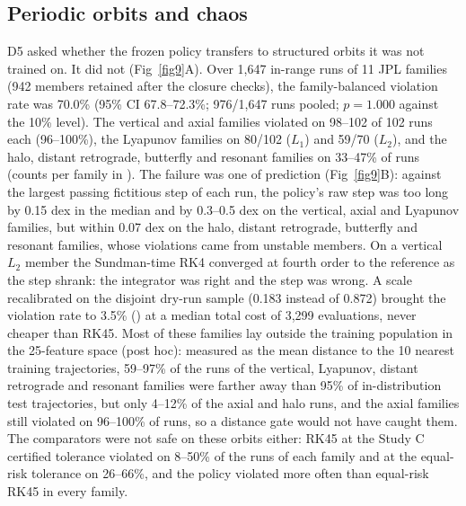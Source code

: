 \documentclass[10pt,letterpaper]{article}
\begin{document}
\subsection*{Periodic orbits and chaos}
D5 asked whether the frozen policy transfers to structured orbits it was not trained on. It did not (Fig~\ref{fig9}A). Over 1,647 in-range runs of 11 JPL families (942 members retained after the closure checks), the family-balanced violation rate was 70.0\% (95\% CI 67.8--72.3\%; 976/1,647 runs pooled; $p = 1.000$ against the 10\% level). The vertical and axial families violated on 98--102 of 102 runs each (96--100\%), the Lyapunov families on 80/102 ($L_1$) and 59/70 ($L_2$), and the halo, distant retrograde, butterfly and resonant families on 33--47\% of runs (counts per family in ). The failure was one of prediction (Fig~\ref{fig9}B): against the largest passing fictitious step of each run, the policy's raw step was too long by 0.15 dex in the median and by 0.3--0.5 dex on the vertical, axial and Lyapunov families, but within 0.07 dex on the halo, distant retrograde, butterfly and resonant families, whose violations came from unstable members. On a vertical $L_2$ member the Sundman-time RK4 converged at fourth order to the reference as the step shrank: the integrator was right and the step was wrong. A scale recalibrated on the disjoint dry-run sample (0.183 instead of 0.872) brought the violation rate to 3.5\% () at a median total cost of 3,299 evaluations, never cheaper than RK45. Most of these families lay outside the training population in the 25-feature space (post hoc): measured as the mean distance to the 10 nearest training trajectories, 59--97\% of the runs of the vertical, Lyapunov, distant retrograde and resonant families were farther away than 95\% of in-distribution test trajectories, but only 4--12\% of the axial and halo runs, and the axial families still violated on 96--100\% of runs, so a distance gate would not have caught them. The comparators were not safe on these orbits either: RK45 at the Study C certified tolerance violated on 8--50\% of the runs of each family and at the equal-risk tolerance on 26--66\%, and the policy violated more often than equal-risk RK45 in every family.
\end{document}
